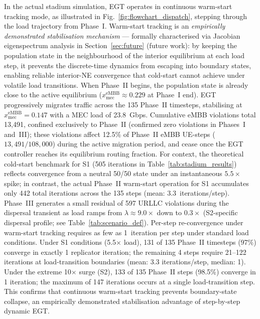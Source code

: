 \documentclass[conference]{IEEEtran}
\begin{document}
In the actual stadium simulation, EGT operates in continuous
warm-start tracking mode, as illustrated in
Fig.~\ref{fig:flowchart_dispatch}, stepping through the load
trajectory from Phase~I. Warm-start tracking is an \emph{empirically
demonstrated stabilisation mechanism} --- formally characterised
via Jacobian eigenspectrum analysis in Section~\ref{sec:future} (future work):
by keeping the population state in the
neighbourhood of the interior equilibrium at each load step, it
prevents the discrete-time dynamics from escaping into boundary
states, enabling reliable interior-NE convergence that cold-start
cannot achieve under volatile load transitions.
When Phase~II begins, the population
state is already close to the active equilibrium
($x_\text{mec}^\text{eMBB} \approx 0.229$ at Phase~I end).
EGT progressively migrates traffic across the 135 Phase~II
timesteps, stabilising at $x_\text{mec}^\text{eMBB} = 0.147$
with a MEC load of 23.8~Gbps. Cumulative eMBB violations
total 13,491, confined exclusively to Phase~II (confirmed
zero violations in Phases~I and~III); these violations affect
12.5\% of Phase~II eMBB UE-steps ($13{,}491 / 108{,}000$)
during the active migration period, and cease once the
EGT controller reaches its equilibrium routing fraction.
For context, the theoretical cold-start benchmark for S1
(505 iterations in Table~\ref{tab:stadium_results}) reflects
convergence from a neutral 50/50 state under an instantaneous
$5.5\times$ spike; in contrast, the actual Phase~II warm-start
operation for S1 accumulates only 442 total iterations across
the 135 steps (mean: 3.3~iterations/step).
Phase~III generates a small residual of 597 URLLC violations
during the dispersal transient as load ramps from $\lambda
\approx 9.0\times$ down to $0.3\times$ (S2-specific dispersal
profile; see Table~\ref{tab:scenario_def}).
Per-step re-convergence under warm-start tracking requires
as few as 1~iteration per step under standard load conditions.
Under S1 conditions (5.5$\times$ load), 131 of 135
Phase~II timesteps (97\%) converge in exactly 1 replicator
iteration; the remaining 4 steps require 21--122 iterations
at load-transition boundaries (mean: 3.3 iterations/step,
median: 1). Under the extreme 10$\times$ surge (S2), 133 of 135
Phase~II steps (98.5\%) converge in 1 iteration; the maximum
of 147 iterations occurs at a single load-transition step.
This confirms that continuous warm-start tracking
prevents boundary-state collapse, an empirically
demonstrated stabilisation advantage of step-by-step dynamic EGT.
\end{document}

